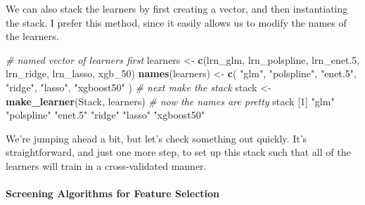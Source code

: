 \documentclass[12pt, krantz2,]{krantz}
\newenvironment{Shaded}{\begin{snugshade}}{\end{snugshade}}
\newcommand{\CommentTok}[1]{\textcolor[rgb]{0.37,0.37,0.37}{\textit{#1}}}
\newcommand{\DecValTok}[1]{\textcolor[rgb]{0.06,0.06,0.06}{#1}}
\newcommand{\FloatTok}[1]{\textcolor[rgb]{0.06,0.06,0.06}{#1}}
\newcommand{\KeywordTok}[1]{\textcolor[rgb]{0.27,0.27,0.27}{\textbf{#1}}}
\newcommand{\NormalTok}[1]{#1}
\newcommand{\OperatorTok}[1]{\textcolor[rgb]{0.43,0.43,0.43}{\textbf{#1}}}
\newcommand{\StringTok}[1]{\textcolor[rgb]{0.5,0.5,0.5}{#1}}
\let\oldparagraph\paragraph
\renewcommand{\paragraph}[1]{\oldparagraph{#1}\mbox{}}
\theoremstyle{definition}
\theoremstyle{definition}
\theoremstyle{definition}
\newcommand{\1}{\mathbbm{1}}
\begin{document}
We can also stack the learners by first creating a vector, and then
instantiating the stack. I prefer this method, since it easily allows us to
modify the names of the learners.

\begin{Shaded}
\begin{Highlighting}[]
\CommentTok{# named vector of learners first}
\NormalTok{learners <-}\StringTok{ }\KeywordTok{c}\NormalTok{(lrn_glm, lrn_polspline, lrn_enet}\FloatTok{.5}\NormalTok{, lrn_ridge, lrn_lasso, xgb_}\DecValTok{50}\NormalTok{)}
\KeywordTok{names}\NormalTok{(learners) <-}\StringTok{ }\KeywordTok{c}\NormalTok{(}
  \StringTok{"glm"}\NormalTok{, }\StringTok{"polspline"}\NormalTok{, }\StringTok{"enet.5"}\NormalTok{, }\StringTok{"ridge"}\NormalTok{, }\StringTok{"lasso"}\NormalTok{, }\StringTok{"xgboost50"}
\NormalTok{)}
\CommentTok{# next make the stack}
\NormalTok{stack <-}\StringTok{ }\KeywordTok{make_learner}\NormalTok{(Stack, learners)}
\CommentTok{# now the names are pretty}
\NormalTok{stack}
\NormalTok{[}\DecValTok{1}\NormalTok{] }\StringTok{"glm"}       \StringTok{"polspline"} \StringTok{"enet.5"}    \StringTok{"ridge"}     \StringTok{"lasso"}     \StringTok{"xgboost50"}
\end{Highlighting}
\end{Shaded}

We're jumping ahead a bit, but let's check something out quickly. It's
straightforward, and just one more step, to set up this stack such that all of
the learners will train in a cross-validated manner.

\begin{Shaded}
\end{Shaded}

\hypertarget{screening-algorithms-for-feature-selection}{%
\paragraph{Screening Algorithms for Feature Selection}\label{screening-algorithms-for-feature-selection}}
\end{document}
